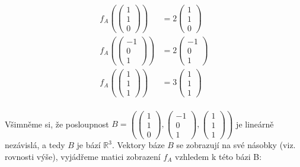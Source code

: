 \documentclass[12pt]{article}
\begin{document}
\begin{align*}
  f_A\left(\left(\begin{array}{c}
    1 \\ 1 \\ 0
  \end{array}\right)\right) &= 2 \left(\begin{array}{c}
    1 \\ 1 \\ 0
  \end{array}\right) \\
  f_A\left(\left(\begin{array}{c}
    -1 \\ 0 \\ 1
  \end{array}\right)\right) &= 2 \left(\begin{array}{c}
    -1 \\ 0 \\ 1
  \end{array}\right) \\
  f_A\left(\left(\begin{array}{c}
    1 \\ 1 \\ 1
  \end{array}\right)\right) &= 3 \left(\begin{array}{c}
    1 \\ 1 \\ 1
  \end{array}\right) \\
\end{align*}

Všimněme si, že posloupnost $B=\left(\left(\begin{array}{c}
    1 \\ 1 \\ 0
  \end{array}\right), \left(\begin{array}{c}
    -1 \\ 0 \\ 1
  \end{array}\right), \left(\begin{array}{c}
    1 \\ 1 \\ 1
  \end{array}\right)\right)$ je lineárně nezávislá, a tedy $B$ je bází $\mathbb{R}^3$.
Vektory báze $B$ se zobrazují na své násobky (viz. rovnosti výše), vyjádřeme matici zobrazení $f_A$ vzhledem k této bázi B:
\end{document}
